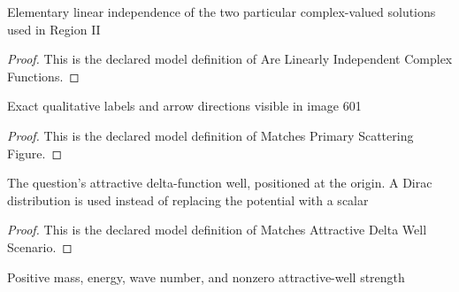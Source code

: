 \begin{definition}
  \label{def:physics:phyx-mini-0601:phyxminiproblems-problemphyxmini0601-arelinearlyindependentcomplexfunctions}
  Elementary linear independence of the two particular complex-valued solutions used in Region II
\end{definition}
\begin{proof}
  This is the declared model definition of Are Linearly Independent Complex Functions.
\end{proof}
\begin{definition}
  \label{def:physics:phyx-mini-0601:phyxminiproblems-problemphyxmini0601-matchesprimaryscatteringfigure}
  Exact qualitative labels and arrow directions visible in image 601
\end{definition}
\begin{proof}
  This is the declared model definition of Matches Primary Scattering Figure.
\end{proof}
\begin{definition}
  \label{def:physics:phyx-mini-0601:phyxminiproblems-problemphyxmini0601-matchesattractivedeltawellscenario}
  The question's attractive delta-function well, positioned at the origin. A Dirac distribution is used instead of replacing the potential with a scalar
\end{definition}
\begin{proof}
  This is the declared model definition of Matches Attractive Delta Well Scenario.
\end{proof}
\begin{definition}
  \label{def:physics:phyx-mini-0601:phyxminiproblems-problemphyxmini0601-hasphysicaldeltawellparameters}
  Positive mass, energy, wave number, and nonzero attractive-well strength
\end{definition}
